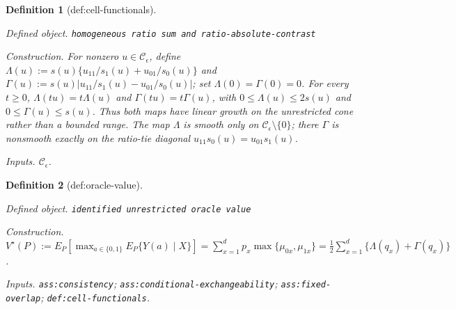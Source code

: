 \documentclass{article}
\newtheorem{definition}{Definition}
\begin{document}
\begin{definition}[def:cell-functionals]\label{def:cell-functionals}
\par\smallskip\noindent\emph{Defined object.} \texttt{homogeneous ratio sum and ratio-\allowbreak{}absolute-\allowbreak{}contrast}
\par\smallskip\noindent\emph{Construction.} For nonzero \(u\in\mathcal C_\epsilon\), define \(\Lambda(u):=s(u)\{u_{11}/s_1(u)+u_{01}/s_0(u)\}\) and \(\Gamma(u):=s(u)\lvert u_{11}/s_1(u)-u_{01}/s_0(u)\rvert\); set \(\Lambda(0)=\Gamma(0)=0\). For every \(t\ge0\), \(\Lambda(tu)=t\Lambda(u)\) and \(\Gamma(tu)=t\Gamma(u)\), with \(0\le\Lambda(u)\le2s(u)\) and \(0\le\Gamma(u)\le s(u)\). Thus both maps have linear growth on the unrestricted cone rather than a bounded range. The map \(\Lambda\) is smooth only on \(\mathcal C_\epsilon\setminus\{0\}\); there \(\Gamma\) is nonsmooth exactly on the ratio-tie diagonal \(u_{11}s_0(u)=u_{01}s_1(u)\).
\par\smallskip\noindent\emph{Inputs.} \(\mathcal C_\epsilon\).
\end{definition}

\begin{definition}[def:oracle-value]\label{def:oracle-value}
\par\smallskip\noindent\emph{Defined object.} \texttt{identified unrestricted oracle value}
\par\smallskip\noindent\emph{Construction.} \(V^\star(P):=E_P[\max_{a\in\{0,1\}}E_P\{Y(a)\mid X\}]=\sum_{x=1}^d p_x\max\{\mu_{0x},\mu_{1x}\}=\frac12\sum_{x=1}^d\{\Lambda(q_x)+\Gamma(q_x)\}\).
\par\smallskip\noindent\emph{Inputs.} \texttt{ass:\allowbreak{}consistency}; \texttt{ass:\allowbreak{}conditional-\allowbreak{}exchangeability}; \texttt{ass:\allowbreak{}fixed-\allowbreak{}overlap}; \texttt{def:\allowbreak{}cell-\allowbreak{}functionals}.
\end{definition}
\end{document}
